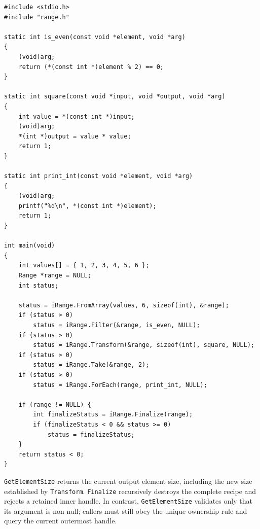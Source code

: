 \begin{verbatim}
#include <stdio.h>
#include "range.h"

static int is_even(const void *element, void *arg)
{
    (void)arg;
    return (*(const int *)element % 2) == 0;
}

static int square(const void *input, void *output, void *arg)
{
    int value = *(const int *)input;
    (void)arg;
    *(int *)output = value * value;
    return 1;
}

static int print_int(const void *element, void *arg)
{
    (void)arg;
    printf("%d\n", *(const int *)element);
    return 1;
}

int main(void)
{
    int values[] = { 1, 2, 3, 4, 5, 6 };
    Range *range = NULL;
    int status;

    status = iRange.FromArray(values, 6, sizeof(int), &range);
    if (status > 0)
        status = iRange.Filter(&range, is_even, NULL);
    if (status > 0)
        status = iRange.Transform(&range, sizeof(int), square, NULL);
    if (status > 0)
        status = iRange.Take(&range, 2);
    if (status > 0)
        status = iRange.ForEach(range, print_int, NULL);

    if (range != NULL) {
        int finalizeStatus = iRange.Finalize(range);
        if (finalizeStatus < 0 && status >= 0)
            status = finalizeStatus;
    }
    return status < 0;
}
\end{verbatim}

\verb|GetElementSize| returns the current output element size, including the
new size established by \verb|Transform|.  \verb|Finalize| recursively
destroys the complete recipe and rejects a retained inner handle.  In contrast,
\verb|GetElementSize| validates only that its argument is non-null; callers
must still obey the unique-ownership rule and query the current outermost
handle.
